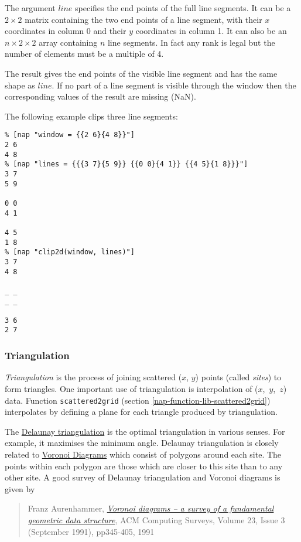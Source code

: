 The argument $\mathit{line}$ specifies the end points of the full line segments.
It can be a $2 \times 2$ matrix containing the two end points of a line segment,
with their $x$ coordinates in column 0
and their $y$ coordinates in column 1.
It can also be an $n \times 2 \times 2$ array containing $n$ line segments.
In fact any rank is legal but the number of elements must be a multiple of 4.

The result gives the end points of the visible line segment
and has the same shape as $\mathit{line}$.
If no part of a line segment is visible through the window then the corresponding
values of the result are missing (NaN).

The following example clips three line segments:
\begin{verbatim}
% [nap "window = {{2 6}{4 8}}"]
2 6
4 8
% [nap "lines = {{{3 7}{5 9}} {{0 0}{4 1}} {{4 5}{1 8}}}"]
3 7
5 9

0 0
4 1

4 5
1 8
% [nap "clip2d(window, lines)"]
3 7
4 8

_ _
_ _

3 6
2 7
\end{verbatim}

\subsubsection{Triangulation}
    \label{function-Triangulation}

  \par 
  \textit{Triangulation} is the process of joining scattered ($x$, $y$) points (called 
  \textit{sites}) to form triangles. One important use of triangulation
  is interpolation of 
  \mbox{($x$, $y$, $z$)} data. Function 
  {\texttt{scattered2grid}} 
  (section \ref{nap-function-lib-scattered2grid})
    interpolates by defining a plane for each triangle produced by triangulation.
  \par The 
  \href{http://www.ics.uci.edu/$\sim$eppstein/gina/delaunay.html}{Delaunay triangulation} is the optimal triangulation in various senses. For
  example, it maximises the minimum angle. Delaunay triangulation is
  closely related to 
  \href{http://www.ics.uci.edu/$\sim$eppstein/gina/voronoi.html}{Voronoi Diagrams} which consist of polygons around each site. The points
  within each polygon are those which are closer to this site than to
  any other site. A good survey of Delaunay triangulation and Voronoi
  diagrams is given by
  \begin{quote}Franz Aurenhammer, 
  \href{http://portal.acm.org/citation.cfm?doid=116873.116880}{\emph{Voronoi diagrams -- a survey of a fundamental geometric data structure}}, ACM Computing Surveys, Volume 23, Issue 3 (September 1991),
  pp345-405, 1991\end{quote}

